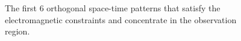 \documentclass[12pt,draftclsnofoot,journal,onecolumn]{IEEEtran}
\begin{document}
\begin{figure}[!t]
	
	\caption{
		The first 6 orthogonal space-time patterns that satisfy the electromagnetic constraints and concentrate in the observation region. 
	}
	\label{fig_cdl_fit}
\end{figure}
\end{document}
